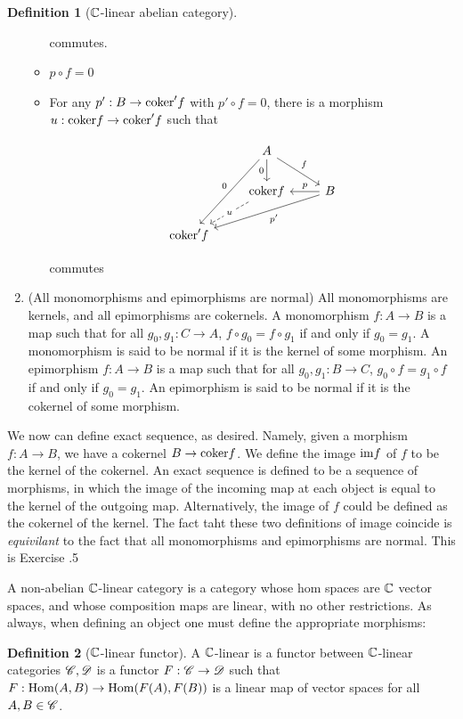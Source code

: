 \documentclass{article}
\theoremstyle{definition}
\newtheorem*{definition}{Definition}
\numberwithin{figure}{section}
\begin{document}
\begin{definition}[$\mathbb{C}$-linear abelian category]
\begin{enumerate}
\begin{itemize}
commutes.

\item $p\circ f=0$
\item For any $p':B\to \mathrm{coker}' f$ with $p'\circ f=0$, there is a morphism $u: \mathrm{coker} f\to \mathrm{coker}' f$ such that

\[\begin{tikzcd}
	& A \\
	& {\coker f} & B \\
	{\coker' f}
	\arrow["f", from=1-2, to=2-3]
	\arrow["0"', from=1-2, to=3-1]
	\arrow["{p'}", from=2-3, to=3-1]
	\arrow["0"', from=1-2, to=2-2]
	\arrow["p"', from=2-3, to=2-2]
	\arrow["u"{description}, dashed, from=2-2, to=3-1]
\end{tikzcd}\]

commutes
\end{itemize}
\item (All monomorphisms and epimorphisms are normal) All monomorphisms are kernels, and all epimorphisms are cokernels. A monomorphism $f:A\to B$ is a map such that for all $g_0,g_1: C\to A$, $f\circ g_0=f\circ g_1$ if and only if $g_0=g_1$. A monomorphism is said to be normal if it is the kernel of some morphism. An epimorphism $f:A\to B$ is a map such that for all $g_0,g_1:B\to C$, $g_0\circ f=g_1\circ f$ if and only if $g_0=g_1$. An epimorphism is said to be normal if it is the cokernel of some morphism.


\end{enumerate}
\raggedleft\qedsymbol{}
\end{definition}

We now can define exact sequence, as desired. Namely, given a morphism $f:A\to B$, we have a cokernel $B\to \mathrm{coker} f$. We define the image $\mathrm{im} f$ of $f$ to be the kernel of the cokernel. An exact sequence is defined to be a sequence of morphisms, in which the image of the incoming map at each object is equal to the kernel of the outgoing map. Alternatively, the image of $f$ could be defined as the cokernel of the kernel. The fact taht these two definitions of image coincide is \textit{equivilant} to the fact that all monomorphisms and epimorphisms are normal. This is Exercise \thesection.5


A non-abelian $\mathbb{C}$-linear category is a category whose hom spaces are $\mathbb{C}$ vector spaces, and whose composition maps are linear, with no other restrictions. As always, when defining an object one must define the appropriate morphisms:

\begin{definition}[$\mathbb{C}$-linear functor] A $\mathbb{C}$-linear is a functor between $\mathbb{C}$-linear categories $\mathscr{C},\mathscr{D}$ is a functor $F:\mathscr{C}\to\mathscr{D}$ such that $F:\mathrm{Hom}(A,B)\to \mathrm{Hom}(F(A),F(B))$ is a linear map of vector spaces for all $A,B\in \mathscr{C}$.
\end{definition}
\end{document}
